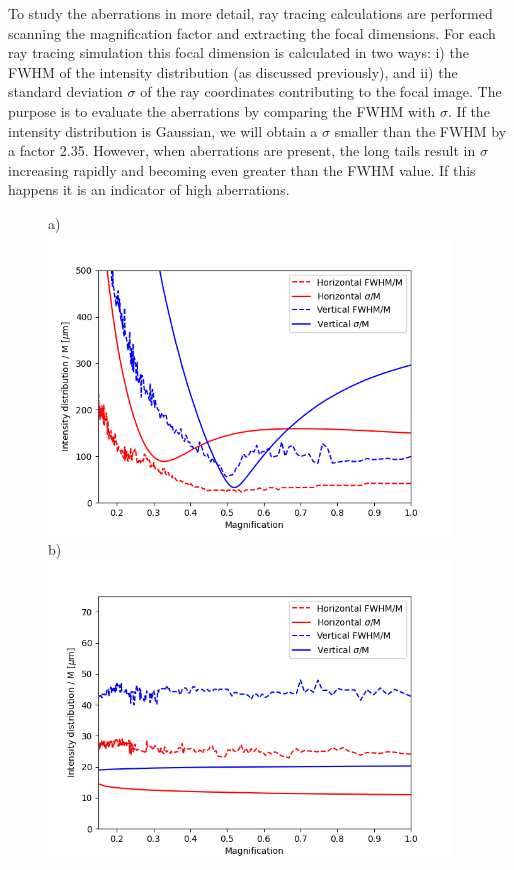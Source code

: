 \documentclass{iucr}              %
\begin{document}
To study the aberrations in more detail, ray tracing calculations are performed scanning the magnification factor and extracting the focal dimensions. For each ray tracing simulation this focal dimension is calculated in two ways: i) the FWHM of the intensity distribution (as discussed previously), and ii) the standard deviation $\sigma$ of the ray coordinates contributing to the focal image. The purpose is to evaluate the aberrations by comparing the FWHM with $\sigma$. If the intensity distribution is Gaussian, we will obtain a $\sigma$ smaller than the FWHM by a factor 2.35. However, when aberrations are present, the long tails result in $\sigma$ increasing rapidly and becoming even greater than the FWHM value. If this happens it is an indicator of high aberrations.  

\begin{figure}\label{fig:scan}
\flushleft
a)\\
\centering
\includegraphics[width=0.95\textwidth]{figures/scan_toroid.png}\\
\flushleft
b)\\
\centering
\includegraphics[width=0.95\textwidth]{figures/scan_diaboloid.png}\\


\end{figure}
\end{document}
